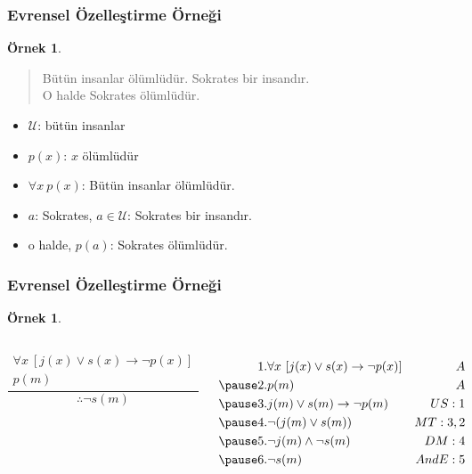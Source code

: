 \documentclass[dvipsnames]{beamer}
\theoremstyle{definition}
\theoremstyle{example}
\newtheorem{ornek}[theorem]{Örnek}
\theoremstyle{plain}
\begin{document}
\begin{frame}
  \frametitle{Evrensel Özelleştirme Örneği}

  \begin{ornek}
    \begin{quote}
      Bütün insanlar ölümlüdür. Sokrates bir insandır.\\
      O halde Sokrates ölümlüdür.
    \end{quote}

    \pause
    \begin{itemize}
      \item $\mathcal{U}$: bütün insanlar
      \item $p(x)$: $x$ ölümlüdür
      \item $\forall x~p(x)$: Bütün insanlar ölümlüdür.
      \item $a$: Sokrates, $a \in \mathcal{U}$: Sokrates bir insandır.
      \item o halde, $p(a)$: Sokrates ölümlüdür.
    \end{itemize}
  \end{ornek}
\end{frame}

\begin{frame}
  \frametitle{Evrensel Özelleştirme Örneği}

  \begin{ornek}
    \begin{columns}
      \[
      \frac
        {
          \begin{array}{c}
            \forall x~[j(x) \vee s(x) \rightarrow \neg p(x)]\\
            p(m)
          \end{array}
        }
        {
          \therefore \neg s(m)
        }
      \]

      \pause
      \begin{eqnarray*}
        1. & \forall x~[j(x) \vee s(x) \rightarrow \neg p(x)] & A\\\pause
        2. & p(m)                                             & A\\\pause
        3. & j(m) \vee s(m) \rightarrow \neg p(m)             & US:1\\\pause
        4. & \neg (j(m) \vee s(m))                            & MT:3,2\\\pause
        5. & \neg j(m) \wedge \neg s(m)                       & DM:4\\\pause
        6. & \neg s(m)                                        & AndE:5
      \end{eqnarray*}
    \end{columns}
  \end{ornek}
\end{frame}
\end{document}
